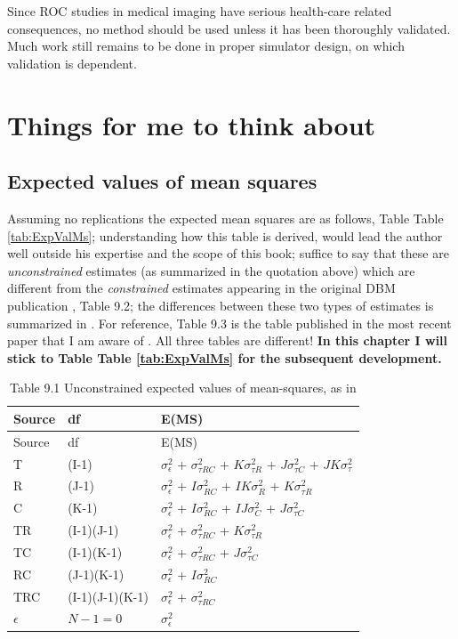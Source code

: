 \documentclass[
]{book}
\begin{document}
Since ROC studies in medical imaging have serious health-care related consequences, no method should be used unless it has been thoroughly validated. Much work still remains to be done in proper simulator design, on which validation is dependent.

\hypertarget{things-for-me-to-think-about}{%
\section{Things for me to think about}\label{things-for-me-to-think-about}}

\hypertarget{expected-values-of-mean-squares-1}{%
\subsection{Expected values of mean squares}\label{expected-values-of-mean-squares-1}}

Assuming no replications the expected mean squares are as follows, Table Table \ref{tab:ExpValMs}; understanding how this table is derived, would lead the author well outside his expertise and the scope of this book; suffice to say that these are \emph{unconstrained} estimates (as summarized in the quotation above) which are different from the \emph{constrained} estimates appearing in the original DBM publication \citep{RN204}, Table 9.2; the differences between these two types of estimates is summarized in \citep{RN2079}. For reference, Table 9.3 is the table published in the most recent paper that I am aware of \citep{RN2508}. All three tables are different! \textbf{In this chapter I will stick to Table Table \ref{tab:ExpValMs} for the subsequent development.}

\begin{longtable}[]{@{}lll@{}}
\caption{Table 9.1 Unconstrained expected values of mean-squares, as in \citep{RN2079}}\tabularnewline
\toprule
Source & df & E(MS)\tabularnewline
\midrule
\endfirsthead
\toprule
Source & df & E(MS)\tabularnewline
\midrule
\endhead
T & (I-1) & \(\sigma_{\epsilon}^{2}\) + \(\sigma_{\tau RC}^{2}\) + \(K\sigma_{\tau R}^{2}\) + \(J\sigma_{\tau C}^{2}\) + \(JK\sigma_{\tau}^{2}\)\tabularnewline
R & (J-1) & \(\sigma_{\epsilon}^{2}\) + \(I\sigma_{RC}^{2}\) + \(IK\sigma_{R}^{2}\) + \(K\sigma_{\tau R}^{2}\)\tabularnewline
C & (K-1) & \(\sigma_{\epsilon}^{2}\) + \(I\sigma_{RC}^{2}\) + \(IJ\sigma_{C}^{2}\) + \(J\sigma_{\tau C}^{2}\)\tabularnewline
TR & (I-1)(J-1) & \(\sigma_{\epsilon}^{2}\) + \(\sigma_{\tau RC}^{2}\) + \(K\sigma_{\tau R}^{2}\)\tabularnewline
TC & (I-1)(K-1) & \(\sigma_{\epsilon}^{2}\) + \(\sigma_{\tau RC}^{2}\) + \(J\sigma_{\tau C}^{2}\)\tabularnewline
RC & (J-1)(K-1) & \(\sigma_{\epsilon}^{2}\) + \(I\sigma_{RC}^{2}\)\tabularnewline
TRC & (I-1)(J-1)(K-1) & \(\sigma_{\epsilon}^{2}\) + \(\sigma_{\tau RC}^{2}\)\tabularnewline
\(\epsilon\) & \(N-1=0\) & \(\sigma_{\epsilon}^{2}\)\tabularnewline
\bottomrule
\end{longtable}
\end{document}

